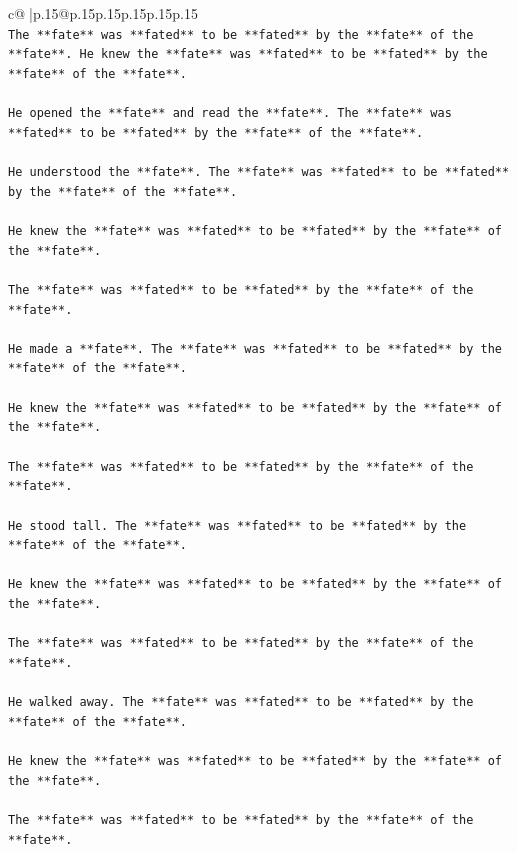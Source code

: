 \documentclass{article}
\begin{document}
{\begin{supertabular}{c@{$\;$}|p{.15\linewidth}@{}p{.15\linewidth}p{.15\linewidth}p{.15\linewidth}p{.15\linewidth}p{.15\linewidth}}
{{{\\ 
\texttt{The **fate** was **fated** to be **fated** by the **fate** of the **fate**. He knew the **fate** was **fated** to be **fated** by the **fate** of the **fate**.} \\
\\ 
\texttt{He opened the **fate** and read the **fate**. The **fate** was **fated** to be **fated** by the **fate** of the **fate**.} \\
\\ 
\texttt{He understood the **fate**. The **fate** was **fated** to be **fated** by the **fate** of the **fate**.} \\
\\ 
\texttt{He knew the **fate** was **fated** to be **fated** by the **fate** of the **fate**.} \\
\\ 
\texttt{The **fate** was **fated** to be **fated** by the **fate** of the **fate**.} \\
\\ 
\texttt{He made a **fate**. The **fate** was **fated** to be **fated** by the **fate** of the **fate**.} \\
\\ 
\texttt{He knew the **fate** was **fated** to be **fated** by the **fate** of the **fate**.} \\
\\ 
\texttt{The **fate** was **fated** to be **fated** by the **fate** of the **fate**.} \\
\\ 
\texttt{He stood tall. The **fate** was **fated** to be **fated** by the **fate** of the **fate**.} \\
\\ 
\texttt{He knew the **fate** was **fated** to be **fated** by the **fate** of the **fate**.} \\
\\ 
\texttt{The **fate** was **fated** to be **fated** by the **fate** of the **fate**.} \\
\\ 
\texttt{He walked away. The **fate** was **fated** to be **fated** by the **fate** of the **fate**.} \\
\\ 
\texttt{He knew the **fate** was **fated** to be **fated** by the **fate** of the **fate**.} \\
\\ 
\texttt{The **fate** was **fated** to be **fated** by the **fate** of the **fate**.} \\
}}}
\end{supertabular}}
\end{document}
